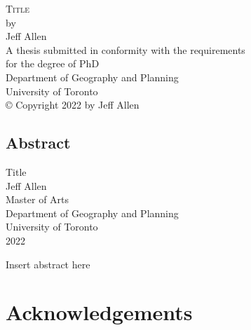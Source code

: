 \documentclass[11 pt, letterpaper]{report}
\begin{document}
	
{\begin{titlepage}
		\large
		\singlespacing
		\begin{center}
			\mbox{}
			\vfill
			\textsc{Title}\\
			\vfill
			by \\
			\vfill
			{Jeff Allen}\\
			\vfill
			\vfill
			A thesis submitted in conformity with the requirements \\
			for the degree of PhD  \\
			Department of Geography and Planning \\
			University of Toronto \\
			\vfill
			{\copyright} Copyright 2022 by Jeff Allen\\
			\vspace{.01\textheight}
			\mbox{}
		\end{center}
		\setcounter{page}{1}
	\end{titlepage}
	\setcounter{page}{2}}






\renewcommand{\thepage}{\roman{page}}%

\newpage



\begin{center}
\section*{Abstract}
	\singlespacing
	{Title}\\[2ex]
	{Jeff Allen}\\
	{Master of Arts}\\
	Department of Geography and Planning\\
	University of Toronto\\
	{2022}\\
\end{center}
Insert abstract here



\vspace{12mm}



\newpage


\chapter*{\Large{Acknowledgements}}

\end{document}
